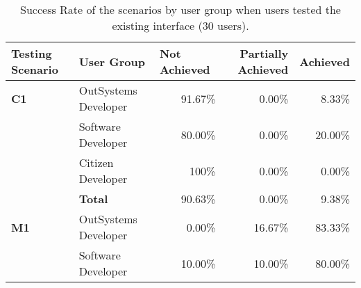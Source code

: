 \begin{table}[tb]
    \caption{Success Rate of the scenarios by user group when users tested the existing interface (30 users).}
    \label{tab:effectiveness_existing_interface}
    \begin{tabular}{@{}llrrr@{}}
    \toprule
    \rowcolor[HTML]{EFEFEF} 
    \textbf{Testing Scenario} & \textbf{User Group}  & \multicolumn{1}{l}{\cellcolor[HTML]{EFEFEF}\textbf{Not Achieved}} & \multicolumn{1}{C{2cm}}{\cellcolor[HTML]{EFEFEF}\textbf{Partially Achieved}} & \multicolumn{1}{l}{\cellcolor[HTML]{EFEFEF}\textbf{Achieved}} \\ \midrule
    \textbf{C1}               & OutSystems Developer & 91.67\%                                                           & 0.00\%                                                                  & 8.33\%                                                        \\
                              & Software Developer   & 80.00\%                                                           & 0.00\%                                                                  & 20.00\%                                                       \\
                              & Citizen Developer    & 100\%                                                             & 0.00\%                                                                  & 0.00\%                                                        \\
                              & \textbf{Total}       & 90.63\%                                                           & 0.00\%                                                                  & 9.38\%                                                        \\ \midrule
    \textbf{M1}               & OutSystems Developer & 0.00\%                                                            & 16.67\%                                                                 & 83.33\%                                                       \\
                              & Software Developer   & 10.00\%                                                           & 10.00\%                                                                 & 80.00\%                                                       \\

\end{tabular}
\end{table}
